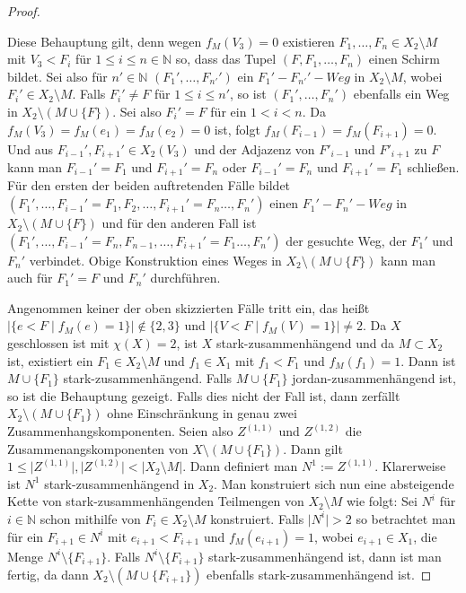 \documentclass[12pt,titlepage]{article}
\begin{document}
\begin{proof}
\begin{itemize}
 Diese Behauptung gilt, denn wegen $f_M(V_3)=0$ existieren $F_1,\ldots,F_n \in X_2\setminus M$ mit $V_3 <F_i$ für $1 \leq i \leq n \in \mathbb{N}$ so, dass das Tupel $(F,F_1,\ldots,F_n)$ einen Schirm bildet.
  Sei also für $n' \in \mathbb{N}$
   $(F_1',\ldots ,F_{n'}')$ ein $F_1'-F_{n'}'-Weg$ in $X_2 \setminus M$, wobei $F_i' \in X_2\setminus M$. 
  Falls $F_i' \neq F$ für $1 \leq i \leq n'$, so ist $(F_1',\ldots,F_n')$ ebenfalls ein Weg in $X_2\setminus (M \cup \{F\})$.
   Sei also $F_i'=F$ für ein $1 < i < n$. Da $f_M(V_3)=f_M(e_1)=f_M(e_2)=0$ ist, folgt $f_M(F_{i-1})=f_M(F_{i+1})=0$. Und aus $F_{i-1}',F_{i+1}' \in X_2(V_3)$ und der Adjazenz von $F'_{i-1}$ und $F'_{i+1}$ zu $F$ kann man $F_{i-1}'=F_1$ und $F_{i+1}'=F_n$ oder $F_{i-1}'=F_n$ und $F_{i+1}'=F_1$ schließen. Für den ersten der beiden auftretenden Fälle bildet $(F_1',\ldots,F_{i-1}'=F_1,F_2, \ldots,F_{i+1}'=F_n\ldots,F_n')$ einen $F_1'-F_n'-Weg$ in $X_2\setminus (M \cup \{F\})$ und für den anderen Fall ist $(F_1',\ldots,F_{i-1}'=F_n,F_{n-1}, \ldots,F_{i+1}'=F_1\ldots,F_n')$ der gesuchte Weg, der $F_1'$ und $F_n'$ verbindet. Obige Konstruktion eines Weges in $X_2 \setminus (M \cup \{F\})$ kann man auch für $F_1'=F$ und $F_n'$ durchführen. 
\end{itemize}
Angenommen keiner der oben skizzierten Fälle tritt ein, das heißt $ \vert\{e <F \mid f_M(e)=1\}\vert \notin \{2,3\}$ und $\vert \{V<F \mid f_M(V)=1\}\vert \neq 2$. Da $X$ geschlossen ist mit $\chi(X)=2$, ist $X$ stark-zusammenhängend und da $M \subset X_2$ ist, existiert ein $F_1\in X_2\setminus M$ und $f_1 \in X_1$ mit $f_1<F_1$ und $f_M(f_1)=1$. Dann ist $M \cup \{F_1\}$ stark-zusammenhängend. Falls $M \cup \{F_1\}$ jordan-zusammenhängend ist, so ist die Behauptung gezeigt. Falls dies nicht der Fall ist, dann zerfällt $X_2 \setminus (M \cup \{F_1\})$  ohne Einschränkung in genau zwei  Zusammenhangskomponenten. Seien also $Z^{(1,1)}$ und $Z^{(1,2)}$ die Zusammenangskomponenten von $X\setminus (M \cup \{F_1\})$. Dann gilt $1\leq \vert Z^{(1,1)}\vert,\vert Z^{(1,2)}\vert < \vert X_2\setminus M\vert$. Dann definiert man $N^1:=Z^{(1,1)}$. Klarerweise ist $N^1$ stark-zusammenhängend in $X_2$. Man konstruiert sich nun eine absteigende Kette von stark-zusammenhängenden Teilmengen von $X_2\setminus M$  wie folgt:
Sei $N^i$ für $i \in \mathbb{N}$ schon mithilfe von $F_i\in X_2\setminus M$ konstruiert. Falls  $\vert N^i \vert>2$ so betrachtet man für ein $F_{i+1}\in N^i$ mit $e_{i+1}<F_{i+1}$ und $f_M(e_{i+1})=1$, wobei $e_{i+1} \in X_1$, die Menge $N^i\setminus \{F_{i+1}\}$. 
Falls $N^i \setminus \{F_{i+1}\}$ stark-zusammenhängend ist, dann ist man fertig, da dann $X_2\setminus (M \cup \{F_{i+1}\})$ ebenfalls stark-zusammenhängend ist.

\end{proof}
\end{document}
